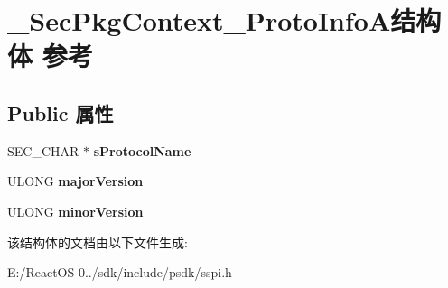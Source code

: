 \hypertarget{struct___sec_pkg_context___proto_info_a}{}\section{\+\_\+\+Sec\+Pkg\+Context\+\_\+\+Proto\+Info\+A结构体 参考}
\label{struct___sec_pkg_context___proto_info_a}
\subsection*{Public 属性}
\begin{DoxyCompactItemize}
\item 
\mbox{\label{struct___sec_pkg_context___proto_info_a_ad2a13c9808e0a0aa0186f8c892b50032}} 
S\+E\+C\+\_\+\+C\+H\+AR $\ast$ {\bfseries s\+Protocol\+Name}
\item 
\mbox{\label{struct___sec_pkg_context___proto_info_a_a924762d3c011807ba267aa1d009f7950}} 
U\+L\+O\+NG {\bfseries major\+Version}
\item 
\mbox{\label{struct___sec_pkg_context___proto_info_a_ab8cf47aff0506c26dd24566b73176225}} 
U\+L\+O\+NG {\bfseries minor\+Version}
\end{DoxyCompactItemize}


该结构体的文档由以下文件生成\+:\begin{DoxyCompactItemize}
\item 
E\+:/\+React\+O\+S-\/0../sdk/include/psdk/sspi.\+h\end{DoxyCompactItemize}
